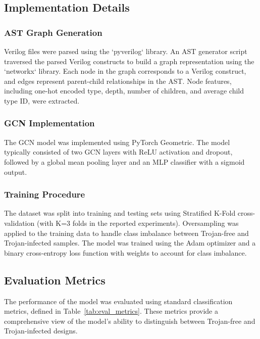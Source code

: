 \documentclass[sigplan,screen]{acmart}
\begin{document}
\subsection{Implementation Details}
\subsubsection{AST Graph Generation}
Verilog files were parsed using the `pyverilog` library. An AST generator script traversed the parsed Verilog constructs to build a graph representation using the `networkx` library. Each node in the graph corresponds to a Verilog construct, and edges represent parent-child relationships in the AST. Node features, including one-hot encoded type, depth, number of children, and average child type ID, were extracted.

\subsubsection{GCN Implementation}
The GCN model was implemented using PyTorch Geometric. The model typically consisted of two GCN layers with ReLU activation and dropout, followed by a global mean pooling layer and an MLP classifier with a sigmoid output.

\subsubsection{Training Procedure}
The dataset was split into training and testing sets using Stratified K-Fold cross-validation (with K=3 folds in the reported experiments). Oversampling was applied to the training data to handle class imbalance between Trojan-free and Trojan-infected samples. The model was trained using the Adam optimizer and a binary cross-entropy loss function with weights to account for class imbalance.

\subsection{Evaluation Metrics}
The performance of the model was evaluated using standard classification metrics, defined in Table~\ref{tab:eval_metrics}. These metrics provide a comprehensive view of the model's ability to distinguish between Trojan-free and Trojan-infected designs.
\end{document}
